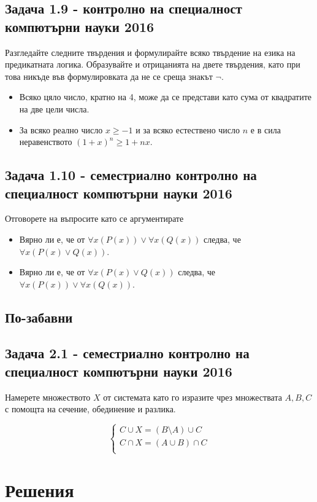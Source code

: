 \documentclass[12pt]{article}
\begin{document}
\subsection*{Задача 1.9 - контролно на специалност компютърни науки 2016}
Разгледайте следните твърдения и формулирайте всяко твърдение на езика на предикатната логика. Образувайте и отрицанията на двете твърдения, като при това никъде във формулировката да не се среща знакът $\neg$.
\begin{itemize}
    \item Всяко цяло число, кратно на 4, може да се представи като сума от квадратите на две цели числа.
    \item За всяко реално число $x \geq -1$ и за всяко естествено число $n$ е в сила неравенството $(1+x)^n \geq 1 + nx$.  
\end{itemize}

\subsection*{Задача 1.10 - семестриално контролно на специалност компютърни науки 2016}
Отговорете на въпросите като се аргументирате
\begin{itemize}
    \item Вярно ли е, че от $\forall x (P(x)) \lor \forall x(Q(x))$ следва, че $\forall x (P(x) \lor Q(x))$.
    \item Вярно ли е, че от $\forall x (P(x) \lor Q(x))$ следва, че $\forall x (P(x)) \lor \forall x(Q(x))$.
\end{itemize}

\subsection*{По-забавни}

\subsection*{Задача 2.1 - семестриално контролно на специалност компютърни науки 2016}
Намерете множеството $X$ от системата като го изразите чрез множествата $A, B, C$ с помощта на сечение, обединение и разлика.

$$ \begin{cases}
    C \cup X = (B \setminus A) \cup C \\
    C \cap X =  (A \cup B) \cap C \\
\end{cases} $$

\section*{Решения}
\end{document}
